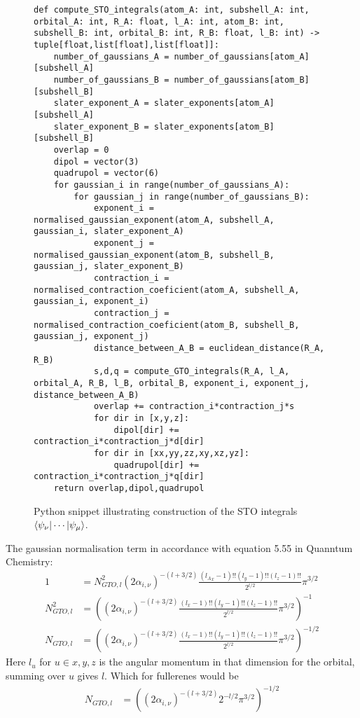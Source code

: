 \begin{figure}[H]
\begin{verbatim}
def compute_STO_integrals(atom_A: int, subshell_A: int, orbital_A: int, R_A: float, l_A: int, atom_B: int, subshell_B: int, orbital_B: int, R_B: float, l_B: int) -> tuple[float,list[float],list[float]]:
    number_of_gaussians_A = number_of_gaussians[atom_A][subshell_A]
    number_of_gaussians_B = number_of_gaussians[atom_B][subshell_B]
    slater_exponent_A = slater_exponents[atom_A][subshell_A]
    slater_exponent_B = slater_exponents[atom_B][subshell_B]
    overlap = 0
    dipol = vector(3)
    quadrupol = vector(6)
    for gaussian_i in range(number_of_gaussians_A):
        for gaussian_j in range(number_of_gaussians_B):
            exponent_i = normalised_gaussian_exponent(atom_A, subshell_A, gaussian_i, slater_exponent_A)
            exponent_j = normalised_gaussian_exponent(atom_B, subshell_B, gaussian_j, slater_exponent_B)
            contraction_i = normalised_contraction_coeficient(atom_A, subshell_A, gaussian_i, exponent_i)
            contraction_j = normalised_contraction_coeficient(atom_B, subshell_B, gaussian_j, exponent_j)
            distance_between_A_B = euclidean_distance(R_A, R_B)
            s,d,q = compute_GTO_integrals(R_A, l_A, orbital_A, R_B, l_B, orbital_B, exponent_i, exponent_j, distance_between_A_B)
            overlap += contraction_i*contraction_j*s
            for dir in [x,y,z]:
                dipol[dir] += contraction_i*contraction_j*d[dir]
            for dir in [xx,yy,zz,xy,xz,yz]:
                quadrupol[dir] += contraction_i*contraction_j*q[dir]
    return overlap,dipol,quadrupol
\end{verbatim}
    \caption{Python snippet illustrating construction of the STO integrals $\braket{\psi_\nu|\cdots|\psi_\mu}$.}
\end{figure}

The gaussian normalisation term in accordance with equation 5.55 in Quanntum Chemistry\cite{daudel}:
\begin{align}
    1&=N_{GTO,l}^2(2\alpha_{i,\nu})^{-(l+3/2)}\frac{({l_A}_x-1)!!({l}_y-1)!!({l}_z-1)!!}{2^{l/2}}\pi^{3/2}\\
    N_{GTO,l}^2&=\left((2\alpha_{i,\nu})^{-(l+3/2)}\frac{({l}_x-1)!!({l}_y-1)!!({l}_z-1)!!}{2^{l/2}}\pi^{3/2}\right)^{-1}\\
    N_{GTO,l}&=\left((2\alpha_{i,\nu})^{-(l+3/2)}\frac{({l}_x-1)!!({l}_y-1)!!({l}_z-1)!!}{2^{l/2}}\pi^{3/2}\right)^{-1/2}
\end{align}
Here $l_u$ for $u\in x,y,z$ is the angular momentum in that dimension for the orbital, summing over $u$ gives $l$.
Which for fullerenes would be 
\begin{align}
    N_{GTO,l}&=\left((2\alpha_{i,\nu})^{-(l+3/2)}2^{-l/2}\pi^{3/2}\right)^{-1/2}
\end{align}

